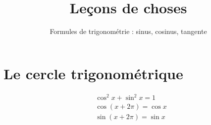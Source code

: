 






\title{{\bf Leçons de choses}}
\subtitle{Formules de trigonométrie : sinus, cosinus, tangente}

\begin{frame}
  
  \debutmontitre

% 

\end{frame}

\setcounter{framenumber}{0}





\section{Le cercle trigonométrique}


\begin{frame}
\end{frame}

\begin{frame}

\hspace*{-2em}
\begin{minipage}{0.7\textwidth}
\end{minipage}
\pause\pause
\begin{minipage}{0.29\textwidth}
\begin{align*}
& \cos^2 x + \sin^2 x = 1 \\
& \cos(x+2\pi)=\cos x \\
& \sin(x+2\pi)=\sin x \\
\end{align*}  

\end{minipage}
\end{frame}


